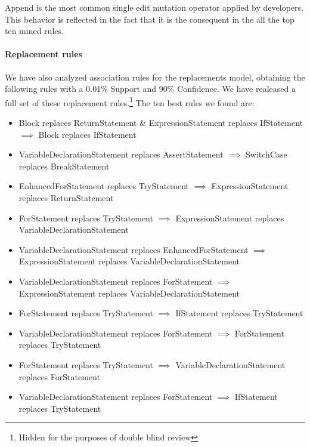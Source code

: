\documentclass[conference]{IEEEtran}
\begin{document}
Append is the most common single edit mutation operator applied by developers. This behavior is
reflected in the fact that it is the consequent in the all the top ten mined
rules.  

\paragraph {Replacement rules} We have also analyzed association rules for the
replacements model, obtaining
the following rules with a 0.01\% Support and 90\% Confidence.
We have realeased a full set of these replacement rules.\footnote{Hidden for the purposes of double blind review} %
The ten best rules we found are:
\begin{itemize}
\item Block replaces ReturnStatement \& ExpressionStatement replaces IfStatement $\implies$ Block replaces IfStatement
\item VariableDeclarationStatement replaces AssertStatement $\implies$ SwitchCase replaces BreakStatement
\item EnhancedForStatement replaces TryStatement $\implies$ ExpressionStatement replaces ReturnStatement
\item ForStatement replaces TryStatement $\implies$ ExpressionStatement replaces VariableDeclarationStatement
\item VariableDeclarationStatement replaces EnhancedForStatement $\implies$ ExpressionStatement replaces VariableDeclarationStatement
\item VariableDeclarationStatement replaces ForStatement $\implies$ ExpressionStatement replaces VariableDeclarationStatement
\item ForStatement replaces TryStatement $\implies$ IfStatement replaces TryStatement
\item VariableDeclarationStatement replaces ForStatement $\implies$ ForStatement replaces TryStatement
\item ForStatement replaces TryStatement $\implies$ VariableDeclarationStatement replaces ForStatement
\item VariableDeclarationStatement replaces ForStatement $\implies$ IfStatement replaces TryStatement
\end{itemize}

\end{document}

